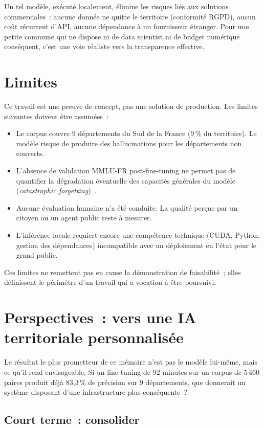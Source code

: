 Un tel modèle, exécuté localement, élimine les risques liés aux solutions commerciales~: aucune donnée ne quitte le territoire (conformité RGPD), aucun coût récurrent d'API, aucune dépendance à un fournisseur étranger. Pour une petite commune qui ne dispose ni de data scientist ni de budget numérique conséquent, c'est une voie réaliste vers la transparence effective.

\section{Limites}

Ce travail est une preuve de concept, pas une solution de production. Les limites suivantes doivent être assumées~:

\begin{itemize}
    \item Le corpus couvre 9 départements du Sud de la France (9\,\% du territoire). Le modèle risque de produire des hallucinations pour les départements non couverts.
    \item L'absence de validation MMLU-FR post-fine-tuning ne permet pas de quantifier la dégradation éventuelle des capacités générales du modèle (\textit{catastrophic forgetting})~\citep{kirkpatrick2017overcoming}.
    \item Aucune évaluation humaine n'a été conduite. La qualité perçue par un citoyen ou un agent public reste à mesurer.
    \item L'inférence locale requiert encore une compétence technique (CUDA, Python, gestion des dépendances) incompatible avec un déploiement en l'état pour le grand public.
\end{itemize}

Ces limites ne remettent pas en cause la démonstration de faisabilité~; elles définissent le périmètre d'un travail qui a vocation à être poursuivi.

\section{Perspectives~: vers une IA territoriale personnalisée}

Le résultat le plus prometteur de ce mémoire n'est pas le modèle lui-même, mais ce qu'il rend envisageable. Si un fine-tuning de 92 minutes sur un corpus de 5\,460 paires produit déjà 83,3\,\% de précision sur 9 départements, que donnerait un système disposant d'une infrastructure plus conséquente~?

\subsection{Court terme~: consolider}

